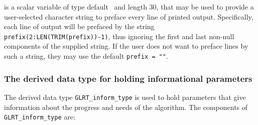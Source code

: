 \documentclass{galahad}
\newcommand{\packagename}{GL\-RT}
\begin{document}
\begin{description}
 is a scalar variable of type default \character\
and length 30, that may be used to provide a user-selected
character string to preface every line of printed output.
Specifically, each line of output will be prefaced by the string
{\tt prefix(2:LEN(TRIM(prefix))-1)},
thus ignoring the first and last non-null components of the
supplied string. If the user does not want to preface lines by such
a string, they may use the default {\tt prefix = ""}.

\end{description}


\subsubsection{The derived data type for holding informational
 parameters}\label{typeinfo}
The derived data type
{\tt \packagename\_inform\_type}
is used to hold parameters that give information about the progress and needs
of the algorithm. The components of
{\tt \packagename\_inform\_type}
are:
\end{document}
